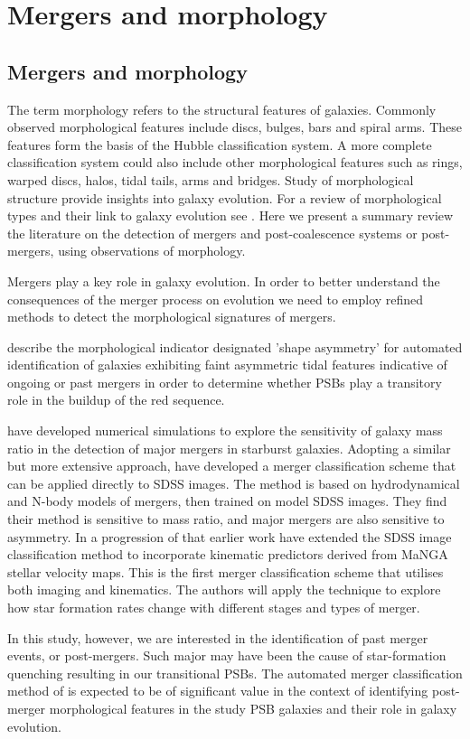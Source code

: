 \section{Mergers and morphology}
\label{sec:mergers}

\subsection{Mergers and morphology}

The term morphology refers to the structural features of galaxies. Commonly observed morphological features include discs, bulges, bars and spiral arms. These features form the basis of the Hubble classification system. A more complete classification system could also include other morphological features such as rings, warped discs, halos, tidal tails, arms and bridges. Study of  morphological structure provide insights into galaxy evolution. For a review of morphological types and their link to galaxy evolution see \cite{2011arXiv1102.0550B}. 
Here we present a summary review the literature on the detection of mergers and post-coalescence systems or post-mergers, using observations of morphology.

Mergers play a key role in galaxy evolution. In order to better understand the consequences of the merger process on evolution we need to employ refined methods to detect the morphological signatures of mergers.

\cite{2016MNRAS.456.3032P} describe the morphological indicator designated 'shape asymmetry' for automated identification of galaxies exhibiting faint asymmetric tidal features indicative of ongoing or past mergers in order to determine whether PSBs play a transitory role in the buildup of the red sequence.   

\cite{2011arXiv1102.0550B} have developed numerical simulations to explore the sensitivity of galaxy mass ratio in the detection of major mergers in starburst galaxies. Adopting a similar but more extensive approach, \cite{2019ApJ...872...76N} have developed a merger classification scheme that can be applied directly to SDSS images. The method is based on hydrodynamical and N-body models of mergers, then trained on model SDSS images. They find their method is sensitive to mass ratio, and major mergers are also sensitive to asymmetry. In a progression of that earlier work  \cite{2019DDA....5020304N} have extended the SDSS image classification method to incorporate kinematic predictors derived from MaNGA stellar velocity maps. This is the first merger classification scheme that utilises both imaging and kinematics. The authors will apply the technique to explore how star formation rates change with different stages and types of merger. 

In this study, however, we are interested in the identification of past merger events, or post-mergers. Such major may have been the cause of star-formation quenching resulting in our transitional PSBs. The automated merger classification method of  \cite{2019DDA....5020304N} is expected to be of significant value in the context of identifying post-merger morphological features in the study PSB galaxies and their role in galaxy evolution. 


